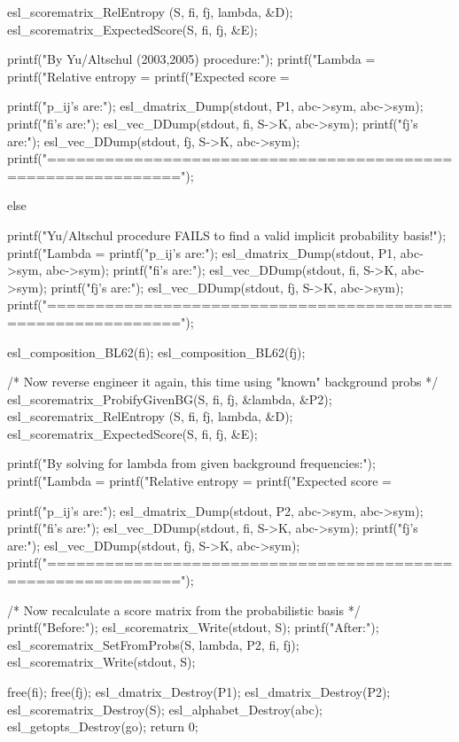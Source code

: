 \begin{cchunk}
{{      esl_scorematrix_RelEntropy   (S, fi, fj, lambda, &D);
      esl_scorematrix_ExpectedScore(S, fi, fj,         &E);

      printf("By Yu/Altschul (2003,2005) procedure:\n");
      printf("Lambda           = %
      printf("Relative entropy = %
      printf("Expected score   = %

      printf("p_ij's are:\n");  esl_dmatrix_Dump(stdout, P1, abc->sym, abc->sym);
      printf("fi's are:\n");    esl_vec_DDump(stdout, fi, S->K, abc->sym);
      printf("fj's are:\n");    esl_vec_DDump(stdout, fj, S->K, abc->sym);
      printf("============================================================\n\n");
      }
  else
    {
      printf("Yu/Altschul procedure FAILS to find a valid implicit probability basis!\n");
      printf("Lambda  = %
      printf("p_ij's are:\n");  esl_dmatrix_Dump(stdout, P1, abc->sym, abc->sym);
      printf("fi's are:\n");    esl_vec_DDump(stdout, fi, S->K, abc->sym);
      printf("fj's are:\n");    esl_vec_DDump(stdout, fj, S->K, abc->sym);
      printf("============================================================\n\n");

      esl_composition_BL62(fi); esl_composition_BL62(fj);
    }

  /* Now reverse engineer it again, this time using "known" background probs */
  esl_scorematrix_ProbifyGivenBG(S, fi, fj, &lambda, &P2);
  esl_scorematrix_RelEntropy   (S, fi, fj, lambda,   &D);
  esl_scorematrix_ExpectedScore(S, fi, fj,           &E);

  printf("By solving for lambda from given background frequencies:\n");
  printf("Lambda           = %
  printf("Relative entropy = %
  printf("Expected score   = %

  printf("p_ij's are:\n");   esl_dmatrix_Dump(stdout, P2, abc->sym, abc->sym);
  printf("fi's are:\n");     esl_vec_DDump(stdout, fi, S->K, abc->sym);
  printf("fj's are:\n");     esl_vec_DDump(stdout, fj, S->K, abc->sym);
  printf("============================================================\n\n");


  /* Now recalculate a score matrix from the probabilistic basis */
  printf("Before:\n");
  esl_scorematrix_Write(stdout, S);
  printf("After:\n");
  esl_scorematrix_SetFromProbs(S, lambda, P2, fi, fj);
  esl_scorematrix_Write(stdout, S);

  free(fi); free(fj);
  esl_dmatrix_Destroy(P1);  esl_dmatrix_Destroy(P2);
  esl_scorematrix_Destroy(S);
  esl_alphabet_Destroy(abc);
  esl_getopts_Destroy(go);
  return 0;
}
\end{cchunk}
